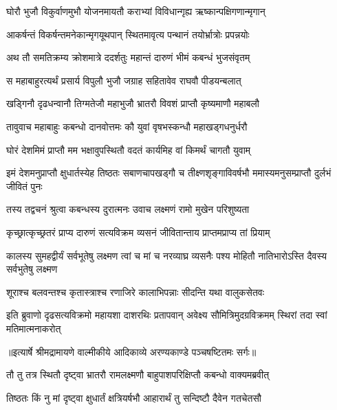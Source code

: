 \twolineshloka
{घोरौ भुजौ विकुर्वाणमुभौ योजनमायतौ}
{कराभ्यां विविधान्गृह्य ऋष्कान्पक्षिगणान्मृगान्} %

\twolineshloka
{आकर्षन्तं विकर्षन्तमनेकान्मृगयूथपान्}
{स्थितमावृत्य पन्थानं तयोर्भ्रात्रोः प्रपन्नयोः} %

\twolineshloka
{अथ तौ समतिक्रम्य क्रोशमात्रे ददर्शतुः}
{महान्तं दारुणं भीमं कबन्धं भुजसंवृतम्} %

\twolineshloka
{स महाबाहुरत्यर्थं प्रसार्य विपुलौ भुजौ}
{जग्राह सहितावेव राघवौ पीडयन्बलात्} %

\twolineshloka
{खड्गिनौ दृढधन्वानौ तिग्मतेजौ महाभुजौ}
{भ्रातरौ विवशं प्राप्तौ कृष्यमाणौ महाबलौ} %

\twolineshloka
{तावुवाच महाबाहुः कबन्धो दानवोत्तमः}
{कौ युवां वृषभस्कन्धौ महाखड्गधनुर्धरौ} %

\twolineshloka
{घोरं देशमिमं प्राप्तौ मम भक्षावुपस्थितौ}
{वदतं कार्यमिह वां किमर्थं चागतौ युवाम्} %

\threelineshloka
{इमं देशमनुप्राप्तौ क्षुधार्तस्येह तिष्ठतः}
{सबाणचापखड्गौ च तीक्ष्णशृङ्गाविवर्षभौ}
{ममास्यमनुसम्प्राप्तौ दुर्लभं जीवितं पुनः} %

\twolineshloka
{तस्य तद्वचनं श्रुत्वा कबन्धस्य दुरात्मनः}
{उवाच लक्ष्मणं रामो मुखेन परिशुष्यता} %

\twolineshloka
{कृच्छ्रात्कृच्छ्रतरं प्राप्य दारुणं सत्यविक्रम}
{व्यसनं जीवितान्ताय प्राप्तमप्राप्य तां प्रियाम्} %

\threelineshloka
{कालस्य सुमहद्वीर्यं सर्वभूतेषु लक्ष्मण}
{त्वां च मां च नरव्याघ्र व्यसनैः पश्य मोहितौ}
{नातिभारोऽस्ति दैवस्य सर्वभुतेषु लक्ष्मण} %

\twolineshloka
{शूराश्च बलवन्तश्च कृतास्त्राश्च रणाजिरे}
{कालाभिपन्नाः सीदन्ति यथा वालुकसेतवः} %

\fourlineindentedshloka
{इति ब्रुवाणो दृढसत्यविक्रमो}
{महायशा दाशरथिः प्रतापवान्}
{अवेक्ष्य सौमित्रिमुदग्रविक्रमम्}
{स्थिरां तदा स्वां मतिमात्मनाकरोत्} %


{॥इत्यार्षे श्रीमद्रामायणे वाल्मीकीये आदिकाव्ये अरण्यकाण्डे पञ्चषष्टितमः सर्गः॥}


\twolineshloka
{तौ तु तत्र स्थितौ दृष्ट्वा भ्रातरौ रामलक्ष्मणौ}
{बाहुपाशपरिक्षिप्तौ कबन्धो वाक्यमब्रवीत्} %

\twolineshloka
{तिष्ठतः किं नु मां दृष्ट्वा क्षुधार्तं क्षत्रियर्षभौ}
{आहारार्थं तु सन्दिष्टौ दैवेन गतचेतसौ} %


